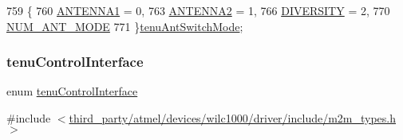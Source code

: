 \begin{DoxyCode}
759              \{
760     \hyperlink{group__WlanEnums_gga2060d527c27ea7770fea3cd48c55dac6aa6754e22a0f4ac467541cd7907cb0626}{ANTENNA1}        = 0,
763     \hyperlink{group__WlanEnums_gga2060d527c27ea7770fea3cd48c55dac6a6729f70205c5448a0283a3d8aed687f5}{ANTENNA2}        = 1,
766     \hyperlink{group__WlanEnums_gga2060d527c27ea7770fea3cd48c55dac6a1c1f77450aca53320cb145634136dc86}{DIVERSITY}     = 2,
770     \hyperlink{group__WlanEnums_gga2060d527c27ea7770fea3cd48c55dac6ab3415d2364ee12c4bb3833b2e0bacea7}{NUM\_ANT\_MODE}
771 \}\hyperlink{group__WlanEnums_ga2060d527c27ea7770fea3cd48c55dac6}{tenuAntSwitchMode};
\end{DoxyCode}
\mbox{\label{group__WlanEnums_ga21dc8518e48f99cdf9cf68eebcfcf982}} 
\subsubsection{\texorpdfstring{tenu\+Control\+Interface}{tenuControlInterface}}
{\footnotesize\ttfamily enum \hyperlink{group__WlanEnums_ga21dc8518e48f99cdf9cf68eebcfcf982}{tenu\+Control\+Interface}}



{\ttfamily \#include $<$\hyperlink{m2m__types_8h}{third\+\_\+party/atmel/devices/wilc1000/driver/include/m2m\+\_\+types.\+h}$>$}

